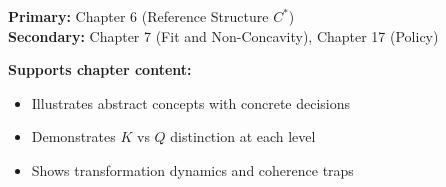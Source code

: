 \begin{tcolorbox}[colback=green!5!white, colframe=green!75!black,
    title=\textbf{Chapter Linkage}]

\textbf{Primary:} Chapter 6 (Reference Structure $C^*$) \\
\textbf{Secondary:} Chapter 7 (Fit and Non-Concavity), Chapter 17 (Policy)

\textbf{Supports chapter content:}
\begin{itemize}[nosep]
    \item Illustrates abstract concepts with concrete decisions
    \item Demonstrates $K$ vs $Q$ distinction at each level
    \item Shows transformation dynamics and coherence traps
\end{itemize}

\end{tcolorbox}


\begin{abstract}
This appendix provides six worked examples demonstrating the EBF framework
at each aggregation level: Individual ($L=1$), Household ($L=2$),
Organization ($L=3$), Region ($L=4$), Nation ($L=5$), and Global ($L=6$).
Each example illustrates how coherence ($K$), quality ($Q$), and the
reference structure ($C^*$) operate in practice. The universal pattern
emerging across all levels: high coherence does not guarantee high quality;
partial transformation often worsens outcomes; and successful change requires
accepting temporary incoherence to reach a better equilibrium.
\end{abstract}


